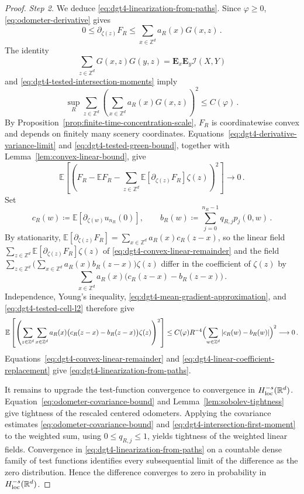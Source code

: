 \documentclass[11pt]{amsart}
\theoremstyle{plain}
\theoremstyle{definition}
\newcommand{\Z}{\mathbb{Z}}
\newcommand{\R}{\mathbb{R}}
\newcommand{\E}{\mathbb{E}}
\begin{document}
\begin{proof}
	\par\smallskip\noindent\emph{Step 2.} We deduce \eqref{eq:dgt4-linearization-from-paths}.
	Since $\varphi\geq0$, \eqref{eq:odometer-derivative} gives
	\[
		0\leq\partial_{\zeta(z)}F_R
		\leq\sum_{x\in\Z^d}a_R(x)G(x,z)\, .
	\]
	The identity
	\[
		\sum_{z\in\Z^d}G(x,z)G(y,z)
		=
		\mathbf E_x\mathbf E_y\mathcal I(X,Y)
	\]
	and \eqref{eq:dgt4-tested-intersection-moments} imply
	\begin{equation}\label{eq:dgt4-tested-green-bound}
		\sup_R\sum_{z\in\Z^d}\left(\sum_{x\in\Z^d}a_R(x)G(x,z)\right)^2
		\leq C(\varphi)\, .
	\end{equation}
		By Proposition~\ref{prop:finite-time-concentration-scale}, $F_R$ is
		coordinatewise convex and depends on finitely many scenery coordinates.
		Equations~\eqref{eq:dgt4-derivative-variance-limit} and
		\eqref{eq:dgt4-tested-green-bound}, together with
		Lemma~\ref{lem:convex-linear-bound}, give
		\begin{equation}\label{eq:dgt4-convex-linear-remainder}
		\E\left[
		\left(
		F_R-\E F_R-\sum_{z\in\Z^d}\E[\partial_{\zeta(z)}F_R]\zeta(z)
		\right)^2
		\right]
		\longrightarrow0\, .
	\end{equation}
	Set
	\[
		c_R(w)\coloneqq\E[\partial_{\zeta(w)}u_{n_R}(0)],
		\qquad
		b_R(w)\coloneqq\sum_{j=0}^{n_R-1}q_{R,j}p_j(0,w)\, .
	\]
	By stationarity, $\E[\partial_{\zeta(z)}F_R]=\sum_{x\in\Z^d}a_R(x)c_R(z-x)$, so the linear field
	$\sum_{z\in\Z^d}\E[\partial_{\zeta(z)}F_R]\zeta(z)$ of \eqref{eq:dgt4-convex-linear-remainder} and the
	field $\sum_{z\in\Z^d}\bigl(\sum_{x\in\Z^d}a_R(x)b_R(z-x)\bigr)\zeta(z)$ differ in the coefficient of $\zeta(z)$ by
	\[
	\sum_{x\in\Z^d}a_R(x)\bigl(c_R(z-x)-b_R(z-x)\bigr)\, .
	\]
	Independence, Young's inequality,
	\eqref{eq:dgt4-mean-gradient-approximation}, and
	\eqref{eq:dgt4-tested-cell-l2} therefore give
	\begin{equation}\label{eq:dgt4-linear-coefficient-replacement}
		\E\left[
		\left(\sum_{z\in\Z^d}\sum_{x\in\Z^d}a_R(x)\bigl(c_R(z-x)-b_R(z-x)\bigr)\zeta(z)\right)^2
		\right]
		\leq C(\varphi)R^{-4}\Bigl(\sum_{w\in\Z^d}|c_R(w)-b_R(w)|\Bigr)^2
		\longrightarrow0\, .
	\end{equation}
	Equations~\eqref{eq:dgt4-convex-linear-remainder} and
	\eqref{eq:dgt4-linear-coefficient-replacement} give \eqref{eq:dgt4-linearization-from-paths}.

	It remains to upgrade the test-function convergence to convergence in
	$H^{-s}_{\rm loc}(\R^d)$. Equation~\eqref{eq:odometer-covariance-bound}
	and Lemma~\ref{lem:sobolev-tightness} give tightness of the rescaled centered
	odometers. Applying the covariance estimates
	\eqref{eq:odometer-covariance-bound} and
	\eqref{eq:dgt4-intersection-first-moment} to the weighted sum, using
	$0\leq q_{R,j}\leq1$, yields tightness of the weighted linear fields.
	Convergence in \eqref{eq:dgt4-linearization-from-paths} on a countable dense
	family of test functions identifies every subsequential limit of the
	difference as the zero distribution. Hence the difference converges to zero
	in probability in $H^{-s}_{\rm loc}(\R^d)$.
\end{proof}
\end{document}

